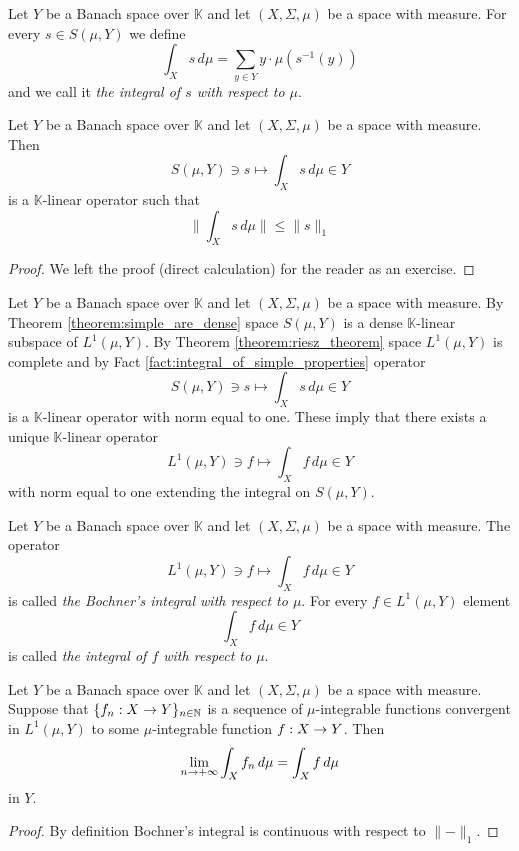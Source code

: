 \begin{definition}
    Let $Y$ be a Banach space over $\mathbb{K}$ and let $(X,\Sigma,\mu)$ be a space with measure. For every $s \in S(\mu, Y)$ we define
    $$\int_X s\,d\mu = \sum_{y\in Y}y\cdot \mu\left(s^{-1}(y)\right)$$
    and we call it \textit{the integral of $s$ with respect to $\mu$}.
\end{definition}

\begin{fact}\label{fact:integral_of_simple_properties}
    Let $Y$ be a Banach space over $\mathbb{K}$ and let $(X,\Sigma,\mu)$ be a space with measure. Then
    $$S(\mu, Y)\ni s \mapsto \int_Xs\,d\mu \in Y$$
    is a $\mathbb{K}$-linear operator such that
    $$\bigg\lVert\int_Xs\,d\mu\bigg\rVert \leq \lVert s \rVert_1$$
\end{fact}
\begin{proof}
    We left the proof (direct calculation) for the reader as an exercise.
\end{proof}
\noindent
Let $Y$ be a Banach space over $\mathbb{K}$ and let $(X,\Sigma,\mu)$ be a space with measure. By Theorem \ref{theorem:simple_are_dense} space $S(\mu, Y)$ is a dense $\mathbb{K}$-linear subspace of $L^1(\mu, Y)$. By Theorem \ref{theorem:riesz_theorem} space $L^1(\mu, Y)$ is complete and by Fact \ref{fact:integral_of_simple_properties} operator
$$S(\mu, Y)\ni s \mapsto \int_Xs\,d\mu \in Y$$
is a $\mathbb{K}$-linear operator with norm equal to one. These imply that there exists a unique $\mathbb{K}$-linear operator
$$L^1(\mu, Y)\ni f\mapsto \int_Xf\,d\mu\in Y$$
with norm equal to one extending the integral on $S(\mu, Y)$.

\begin{definition}
    Let $Y$ be a Banach space over $\mathbb{K}$ and let $(X,\Sigma,\mu)$ be a space with measure. The operator
    $$L^1(\mu, Y)\ni f\mapsto \int_Xf\,d\mu\in Y$$
    is called \textit{the Bochner's integral with respect to $\mu$}. For every $f\in L^1(\mu, Y)$ element
    $$\int_Xf\,d\mu\in Y$$
    is called \textit{the integral of $f$ with respect to $\mu$}.
\end{definition}

\begin{corollary}\label{corollary:convergence_of_integral}
    Let $Y$ be a Banach space over $\mathbb{K}$ and let $(X,\Sigma,\mu)$ be a space with measure. Suppose that $\{f_n:X\rightarrow Y\}_{n\in {\mathbb N}}$ is a sequence of $\mu$-integrable functions convergent in $L^1(\mu, Y)$ to some $\mu$-integrable function $f:X\rightarrow Y$. Then
    $$\lim_{n\rightarrow +\infty}\int_Xf_n\,d\mu = \int_Xf\,d\mu$$
    in $Y$.
\end{corollary}
\begin{proof}
    By definition Bochner's integral is continuous with respect to $\lVert-\rVert_1$.
\end{proof}

